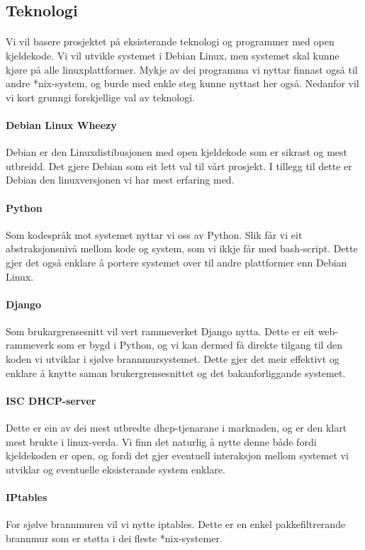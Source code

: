 \documentclass[nynorsk,12pt,a4paper]{article}
\begin{document}
\subsection{Teknologi}
\paragraph{}
Vi vil basere prosjektet på eksisterande teknologi og programmer med open kjeldekode. Vi vil utvikle systemet i Debian Linux, men systemet skal kunne kjøre på alle linuxplattformer. Mykje av dei programma vi nyttar finnast også til andre *nix-system, og burde med enkle steg kunne nyttast her også. Nedanfor vil vi kort grunngi forskjellige val av teknologi. 
\paragraph{Debian Linux Wheezy}
Debian er den Linuxdistibusjonen med open kjeldekode som er sikrast og mest utbreidd. Det gjere Debian som eit lett val til vårt prosjekt. I tillegg til dette er Debian den linuxversjonen vi har mest erfaring med.
\paragraph{Python}
Som kodespråk mot systemet nyttar vi oss av Python. Slik får vi eit abstraksjonsnivå mellom kode og system, som vi ikkje får med bash-script. Dette gjer det også enklare å portere systemet over til andre plattformer enn Debian Linux. 
\paragraph{Django}
Som brukargrensesnitt vil vert rammeverket Django nytta. Dette er eit web-rammeverk som er bygd i Python, og vi kan dermed få direkte tilgang til den koden vi utviklar i sjølve brannmursystemet. Dette gjer det meir effektivt og enklare å knytte saman brukergrensesnittet og det bakanforliggande systemet.
\paragraph{ISC DHCP-server}
Dette er ein av dei mest utbredte dhcp-tjenarane i marknaden, og er den klart mest brukte i linux-verda. Vi finn det naturlig å nytte denne både fordi kjeldekoden er open, og fordi det gjer eventuell interaksjon mellom systemet vi utviklar og eventuelle eksisterande system enklare. 
\paragraph{IPtables}
For sjølve brannmuren vil vi nytte iptables. Dette er en enkel pakkefiltrerande brannmur som er støtta i dei fleste *nix-systemer. 
\end{document}

